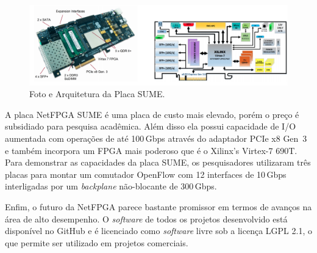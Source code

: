 \begin{figure}[h]
\centering
\includegraphics[scale=0.4]{figures/netfpga-rev/sume.png}
\caption{Foto e Arquitetura da Placa SUME.}
\label{fig:sume}
\end{figure}

A placa NetFPGA SUME é uma placa de custo mais elevado, porém o preço é
subsidiado para pesquisa acadêmica. Além disso ela possui capacidade de
I/O aumentada com operações de até 100\,Gbps através do adaptador PCIe
x8 Gen~3 e também incorpora um  FPGA mais poderoso que é o Xilinx’s
Virtex-7 690T. Para demonstrar as capacidades da placa SUME, os
pesquisadores utilizaram três placas para montar um comutador OpenFlow
com 12 interfaces de 10\,Gbps interligadas por um \emph{backplane}
não-blocante de 300\,Gbps.

Enfim, o futuro da NetFPGA parece bastante promissor em termos de
avanços na área de alto desempenho. O \textit{software} de todos os
projetos desenvolvido  está disponível no GitHub e é licenciado como
\emph{software} livre sob a licença LGPL 2.1, o que permite ser
utilizado em projetos comerciais.
